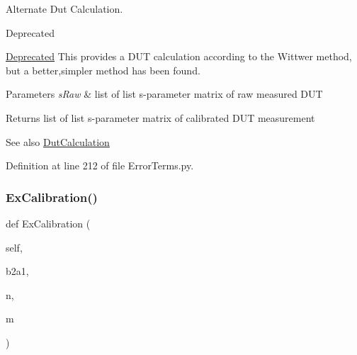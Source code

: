 Alternate Dut Calculation. 

\begin{DoxyRefDesc}{Deprecated}
\item[\hyperlink{deprecated__deprecated000001}{Deprecated}]This provides a D\+UT calculation according to the Wittwer method, but a better,simpler method has been found.\end{DoxyRefDesc}

\begin{DoxyParams}{Parameters}
{\em s\+Raw} & list of list s-\/parameter matrix of raw measured D\+UT \\
\hline
\end{DoxyParams}
\begin{DoxyReturn}{Returns}
list of list s-\/parameter matrix of calibrated D\+UT measurement 
\end{DoxyReturn}
\begin{DoxySeeAlso}{See also}
\hyperlink{classSignalIntegrity_1_1Measurement_1_1Calibration_1_1ErrorTerms_1_1ErrorTerms_ac257ff0d436f9c02507349f82ece9e56}{Dut\+Calculation} 
\end{DoxySeeAlso}


Definition at line 212 of file Error\+Terms.\+py.

\mbox{\label{classSignalIntegrity_1_1Measurement_1_1Calibration_1_1ErrorTerms_1_1ErrorTerms_a7dd89d542be158c0b13f2c0b7f2a852c}} 
\subsubsection{\texorpdfstring{Ex\+Calibration()}{ExCalibration()}}
{\footnotesize\ttfamily def Ex\+Calibration (\begin{DoxyParamCaption}\item[{}]{self,  }\item[{}]{b2a1,  }\item[{}]{n,  }\item[{}]{m }\end{DoxyParamCaption})}



